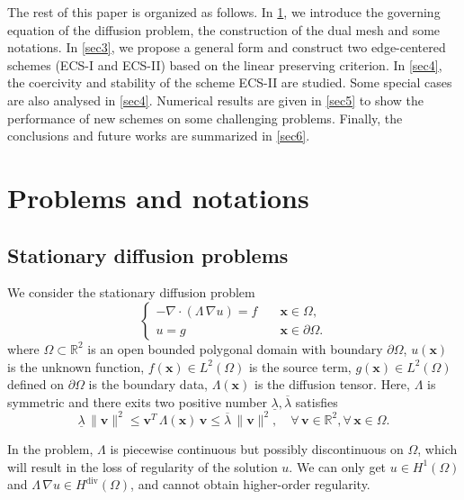 \documentclass[times,review,preprint]{elsarticle}
\newcommand{\bx}{\bm{x}}
\begin{document}
The rest of this paper is organized as follows. In \cref{sec2}, we introduce the governing equation of the diffusion problem, the construction of the dual mesh and some notations. In \cref{sec3}, we propose a general form and construct two edge-centered schemes (ECS-I and ECS-II) based on the linear preserving criterion. In \cref{sec4}, the coercivity and stability of the scheme ECS-II are studied. Some special cases are also analysed in \cref{sec4}. Numerical results are given in \cref{sec5} to show the performance of new schemes on some challenging problems. Finally, the conclusions and future works are summarized in \cref{sec6}.

\section{Problems and notations}\label{sec2}

\subsection{Stationary diffusion problems}\label{sec:prob}

We consider the stationary diffusion problem
\begin{equation}\label{eq:prob}
\left\{
\begin{aligned}
- \nabla \cdot (\Lambda \, \nabla u) = f & \quad \bx \in \Omega, \\
u = g & \quad \bx \in \partial \Omega.
\end{aligned}
\right.
\end{equation}
where $\Omega \subset \mathbb{R}^2$ is an open bounded polygonal domain with boundary $\partial \Omega$, $u(\bx)$ is the unknown function, $f(\bx) \in L^2(\Omega)$ is the source term, $g(\bx) \in L^2(\Omega)$ defined on $\partial \Omega$ is the boundary data, $\Lambda(\bx)$ is the diffusion tensor. Here, $\Lambda$ is symmetric and there exits two positive number $\underline{\lambda}, \overline{\lambda}$ satisfies
\begin{equation*}
\underline{\lambda} \, \|\bm{v}\|^2 \leq \bm{v}^T \, \Lambda(\bx) \, \bm{v} \leq \overline{\lambda} \, \|\bm{v}\|^2, \quad \forall \, \bm{v} \in \mathbb{R}^2, \forall \, \bx \in \Omega.
\end{equation*}

In the problem, $\Lambda$ is piecewise continuous but possibly discontinuous on $\Omega$, which will result in the loss of regularity of the solution $u$. We can only get $u \in H^1(\Omega)$ and $\Lambda \, \nabla u \in H^{\text{div}}(\Omega)$, and cannot obtain higher-order regularity.
\end{document}
